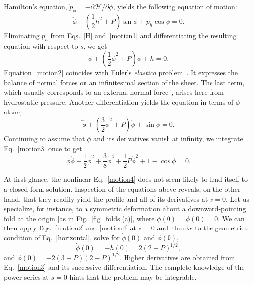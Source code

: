\documentclass[prl,twocolumn,showpacs]{revtex4}
\begin{document}
Hamilton's equation,
$\dot{p}_\phi=-\partial\mathcal{H}/\partial\phi$, yields the following
equation of motion:
\begin{equation}
  \ddot{\phi} + \left(\frac{1}{2}h^2 + P\right)\sin\phi
  + p_h\cos\phi = 0.
  \label{motion1}
\end{equation}
Eliminating $p_h$ from Eqs.~\eqref{H} and~\eqref{motion1} and
differentiating the resulting equation with respect to $s$, we get
\begin{equation}
  \dddot{\phi} + \left(\frac{1}{2}\dot{\phi}^2 + P\right)\dot{\phi}
  + h = 0.
  \label{motion2}
\end{equation}
Equation~\eqref{motion2} coincides with Euler's \textit{elastica}
problem~\cite{Thompson,CerdaMaha2005,WittenRMP}. It expresses the
balance of normal forces on an infinitesimal section of the sheet. The last
term, which usually corresponds to an external normal
force~\cite{CerdaMaha2005}, arises here from hydrostatic pressure. Another
differentiation yields the equation in terms of $\phi$ alone,
\begin{equation}
  \ddddot{\phi}
  + \left(\frac{3}{2}\dot{\phi}^2 + P\right)\ddot{\phi}
  + \sin\phi = 0.
  \label{motion3}
\end{equation}
Continuing to assume that $\phi$ and its derivatives vanish at
infinity, we integrate Eq.~\eqref{motion3} once to get
\begin{equation}
  \dddot{\phi}\dot{\phi}
  - \frac{1}{2}\ddot{\phi}^2
  + \frac{3}{8}\dot{\phi}^4
  + \frac{1}{2}P\dot{\phi}^2
  + 1-\cos\phi
  = 0.
  \label{motion4}
\end{equation}

At first glance, the nonlinear Eq.~\eqref{motion4} does not seem
likely to lend itself to a closed-form solution. Inspection of the
equations above reveals, on the other hand, that they readily yield
the profile and all of its derivatives at $s=0$. Let us specialize,
for instance, to a symmetric deformation about a downward-pointing
fold at the origin [as in Fig.~\ref{fig_folds}(a)], where
$\phi(0)=\ddot{\phi}(0)=0$. We can then apply Eqs.~\eqref{motion2} and
\eqref{motion4} at $s=0$ and, thanks to the geometrical condition of
Eq.~\eqref{horizontal}, solve for $\dot{\phi}(0)$ and
$\dddot{\phi}(0)$,
\begin{equation}
  \dot{\phi}(0) = -h(0) = 2(2-P)^{1/2},
  \label{h0}
\end{equation}
and $\dddot{\phi}(0)=-2(3-P)(2-P)^{1/2}$. Higher derivatives are
obtained from Eq.~\eqref{motion3} and its successive differentiation.
The complete knowledge of the power-series at $s=0$ hints that the
problem may be integrable.
\end{document}

